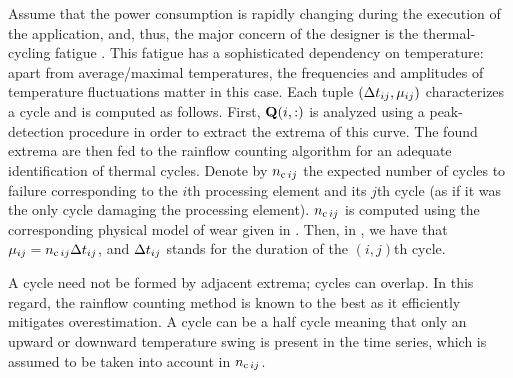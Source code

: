 Assume that the power consumption is rapidly changing during the execution of the application, and, thus, the major concern of the designer is the thermal-cycling fatigue \cite{jedec2011}.
This fatigue has a sophisticated dependency on temperature: apart from average/maximal temperatures, the frequencies and amplitudes of temperature fluctuations matter in this case.
Each tuple $(\dt_{ij}, \mu_{ij})$ characterizes a cycle and is computed as follows.
First, $\mQ(i, :)$ is analyzed using a peak-detection procedure in order to extract the extrema of this curve.
The found extrema are then fed to the rainflow counting algorithm \cite{xiang2010} for an adequate identification of thermal cycles.
Denote by $\ncycles[ij]$ the expected number of cycles to failure corresponding to the $i$th processing element and its $j$th cycle (as if it was the only cycle damaging the processing element).
$\ncycles[ij]$ is computed using the corresponding physical model of wear given in \cite{jedec2011, xiang2010}.
Then, in , we have that $\mu_{ij} = \ncycles[ij] \dt_{ij}$, and $\dt_{ij}$ stands for the duration of the $(i, j)$th cycle.
\begin{remark} 
A cycle need not be formed by adjacent extrema; cycles can overlap.
In this regard, the rainflow counting method is known to the best as it efficiently mitigates overestimation.
A cycle can be a half cycle meaning that only an upward or downward temperature swing is present in the time series, which is assumed to be taken into account in $\ncycles[ij]$.
\end{remark}
